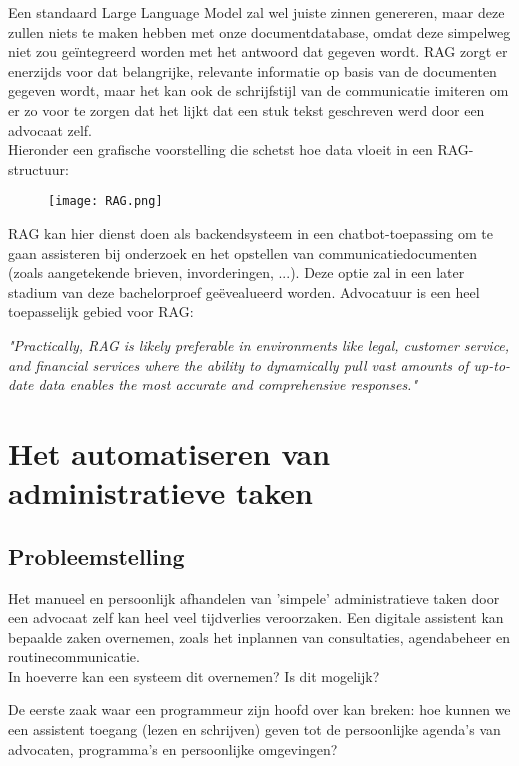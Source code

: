 Een standaard Large Language Model zal wel juiste zinnen genereren, maar deze zullen niets te maken hebben met onze documentdatabase, omdat deze simpelweg niet zou geïntegreerd worden met het antwoord dat gegeven wordt.
RAG zorgt er enerzijds voor dat belangrijke, relevante informatie op basis van de documenten gegeven wordt, maar het kan ook de schrijfstijl van de communicatie imiteren om er zo voor te zorgen dat het lijkt dat een stuk tekst
geschreven werd door een advocaat zelf. \\

Hieronder een grafische voorstelling die schetst hoe data vloeit in een RAG-structuur:
\begin{figure}[h]
	\texttt{[image: RAG.png]}
	\centering
\end{figure}
\autocite{MediumRAG}

RAG kan hier dienst doen als backendsysteem in een chatbot-toepassing om te gaan assisteren bij onderzoek en het opstellen van communicatiedocumenten (zoals aangetekende brieven, invorderingen, ...). 
Deze optie zal in een later stadium van deze bachelorproef geëvealueerd worden. Advocatuur is een heel toepasselijk gebied voor RAG:

\begin{displayquote}
	\textit{"Practically, RAG is likely preferable in environments like
		legal, customer service, and financial services where the ability to
		dynamically pull vast amounts of up-to-date data enables the most accurate and comprehensive responses."} \autocite{MediumRAG}
\end{displayquote}

\newpage
\section{Het automatiseren van administratieve taken}
\subsection{Probleemstelling}
Het manueel en persoonlijk afhandelen van 'simpele' administratieve taken door een advocaat zelf kan heel veel tijdverlies veroorzaken.
Een digitale assistent kan bepaalde zaken overnemen, zoals het inplannen van consultaties, agendabeheer en routinecommunicatie. \\
In hoeverre kan een systeem dit overnemen? Is dit mogelijk?

De eerste zaak waar een programmeur zijn hoofd over kan breken:
hoe kunnen we een assistent toegang (lezen en schrijven) geven tot de persoonlijke agenda's van advocaten, programma's en persoonlijke omgevingen?

